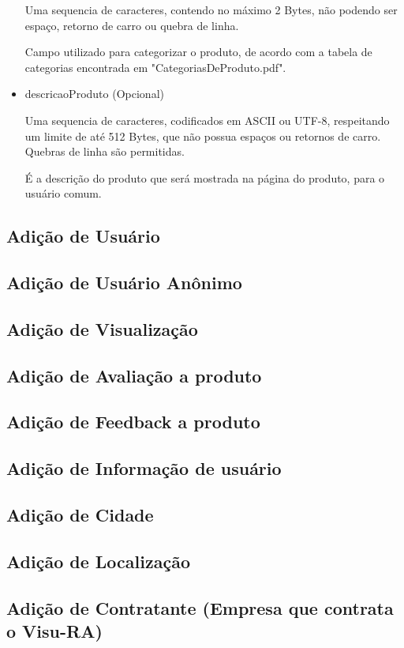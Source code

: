 \documentclass{article}
\begin{document}
\begin{itemize}
						\par Uma sequencia de caracteres, contendo no máximo 2 Bytes, não podendo ser espaço, retorno de carro ou quebra de linha.
						\par Campo utilizado para categorizar o produto, de acordo com a tabela de categorias encontrada em "CategoriasDeProduto.pdf".
					\item{descricaoProduto} (Opcional)
						\par Uma sequencia de caracteres, codificados em ASCII ou UTF-8, respeitando um limite de até 512 Bytes, que não possua espaços ou retornos de carro. Quebras de linha são permitidas.
						\par É a descrição do produto que será mostrada na página do produto, para o usuário comum.
				\end{itemize}
		
		\subsection{Adição de Usuário}
		\subsection{Adição de Usuário Anônimo}
		\subsection{Adição de Visualização}
		\subsection{Adição de Avaliação a produto}
		\subsection{Adição de Feedback a produto}
		\subsection{Adição de Informação de usuário}
		\subsection{Adição de Cidade}
		\subsection{Adição de Localização}
		\subsection{Adição de Contratante (Empresa que contrata o Visu-RA)}
\end{document}
